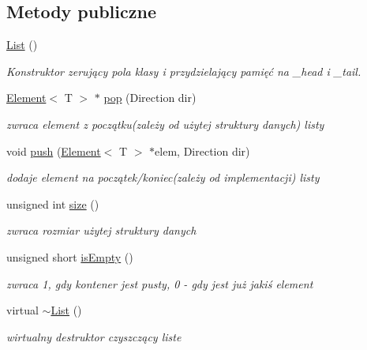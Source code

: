\subsection*{Metody publiczne}
\begin{DoxyCompactItemize}
\item 
\hypertarget{class_list_implementation_1_1_list_a10d3f7ae55c6a0fecfc128adce8c780a}{\hyperlink{class_list_implementation_1_1_list_a10d3f7ae55c6a0fecfc128adce8c780a}{List} ()}\label{class_list_implementation_1_1_list_a10d3f7ae55c6a0fecfc128adce8c780a}

\begin{DoxyCompactList}\small\item\em Konstruktor zerujący pola klasy i przydzielający pamięć na \-\_\-head i \-\_\-tail. \end{DoxyCompactList}\item 
\hyperlink{class_element}{Element}$<$ T $>$ $\ast$ \hyperlink{class_list_implementation_1_1_list_ade59f70b0f166150ad68f7c21cceb6f2}{pop} (Direction dir)
\begin{DoxyCompactList}\small\item\em zwraca element z początku(zależy od użytej struktury danych) listy \end{DoxyCompactList}\item 
void \hyperlink{class_list_implementation_1_1_list_a8138a1cf63d2fa78f96225871d1e2e9d}{push} (\hyperlink{class_element}{Element}$<$ T $>$ $\ast$elem, Direction dir)
\begin{DoxyCompactList}\small\item\em dodaje element na początek/koniec(zależy od implementacji) listy \end{DoxyCompactList}\item 
unsigned int \hyperlink{class_list_implementation_1_1_list_a4478f376ab24848ed7809c3819c31dfd}{size} ()
\begin{DoxyCompactList}\small\item\em zwraca rozmiar użytej struktury danych \end{DoxyCompactList}\item 
unsigned short \hyperlink{class_list_implementation_1_1_list_a1a886e08a6c178dfe3fc0d5285672f27}{is\-Empty} ()
\begin{DoxyCompactList}\small\item\em zwraca 1, gdy kontener jest pusty, 0 -\/ gdy jest już jakiś element \end{DoxyCompactList}\item 
virtual \hyperlink{class_list_implementation_1_1_list_a6d73f9b98132a4503ffd440eb8ae2afd}{$\sim$\-List} ()
\begin{DoxyCompactList}\small\item\em wirtualny destruktor czyszczący liste \end{DoxyCompactList}\end{DoxyCompactItemize}


